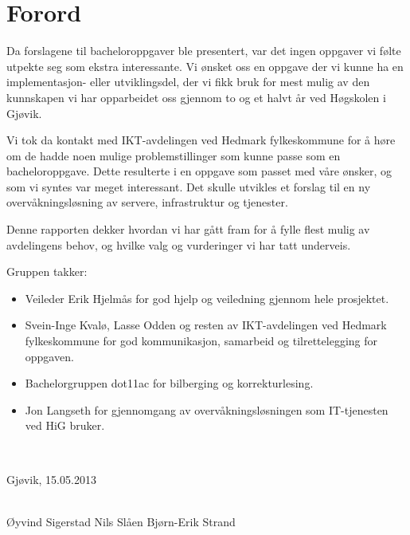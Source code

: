 \chapter*{Forord}
Da forslagene til bacheloroppgaver ble presentert, var det ingen oppgaver vi følte utpekte seg som ekstra interessante. Vi ønsket oss en oppgave der vi kunne ha en implementasjon- eller utviklingsdel, der vi fikk bruk for mest mulig av den kunnskapen vi har opparbeidet oss gjennom to og et halvt år ved Høgskolen i Gjøvik. 

Vi tok da kontakt med IKT-avdelingen ved Hedmark fylkeskommune for å høre om de hadde noen mulige problemstillinger som kunne passe som en bacheloroppgave. Dette resulterte i en oppgave som passet med våre ønsker, og som vi syntes var meget interessant. Det skulle utvikles et forslag til en ny overvåkningsløsning av servere, infrastruktur og tjenester. 

Denne rapporten dekker hvordan vi har gått fram for å fylle flest mulig av avdelingens behov, og hvilke valg og vurderinger vi har tatt underveis.
 
Gruppen takker:
\begin{itemize} 
\item Veileder Erik Hjelmås for god hjelp og veiledning gjennom hele prosjektet.
\item Svein-Inge Kvalø, Lasse Odden og resten av IKT-avdelingen ved Hedmark fylkeskommune for god kommunikasjon, samarbeid og tilrettelegging for oppgaven.
\item Bachelorgruppen dot11ac for bilberging og korrekturlesing.
\item Jon Langseth for gjennomgang av overvåkningsløsningen som IT-tjenesten ved HiG bruker.
\end{itemize}
\

Gjøvik, 15.05.2013
\\\\
\begin{tabbing}
Øyvind Sigerstad \hspace{3cm} Nils Slåen \hspace{3cm} Bjørn-Erik Strand
\end{tabbing}
